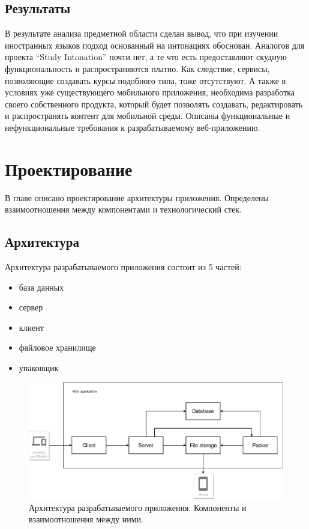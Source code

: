 \documentclass[%
  a5paper,
  subf,
  href,
  master,
  dotsinheaders 
]{csse-fcs}
\begin{document}
\section{Результаты}

В результате анализа предметной области сделан вывод, что при изучении иностранных языков подход основанный на интонациях обоснован. Аналогов для проекта “Study Intonation” почти нет, а те что есть предоставляют скудную функциональность и распространяются платно. Как следствие, сервисы, позволяющие создавать курсы подобного типа, тоже отсутствуют. А также в условиях уже существующего мобильного приложения, необходима разработка своего собственного продукта, который будет позволять создавать, редактировать и распространять контент для мобильной среды. Описаны функциональные и нефункциональные требования к разрабатываемому веб-приложению.

\chapter{Проектирование}

В главе описано проектирование архитектуры приложения. Определены взаимоотношения между компонентами и технологический стек. 


\section{Архитектура}

Архитектура разрабатываемого приложения состоит из 5 частей:

\begin{itemize}
	\item база данных
	\item сервер
	\item клиент
	\item файловое хранилище
	\item упаковщик
\end{itemize}

\begin{figure}[H]
\includegraphics[width=1\textwidth]{img/1.png}
\captionsetup{justification=justified}
\caption{Архитектура разрабатываемого приложения. Компоненты и взаимоотношения между ними. }
\label{architecture_comp}
\end{figure}
\end{document}
